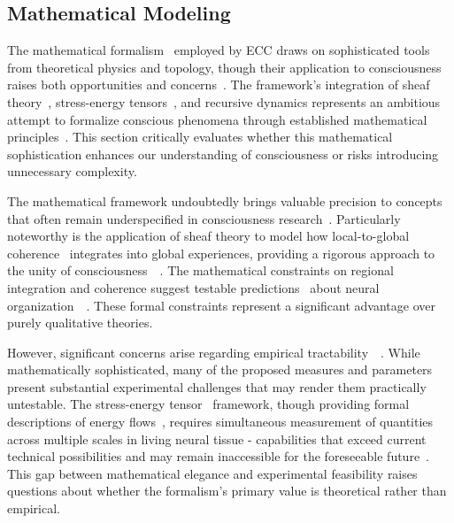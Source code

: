 \subsection*{Mathematical Modeling~}

The mathematical formalism~ employed by ECC draws on sophisticated tools from theoretical physics and topology, though their application to consciousness raises both opportunities and concerns~\cite{rosen2012anticipatory, kelso2016dynamic}. The framework's integration of sheaf theory~, stress-energy tensors~, and recursive dynamics represents an ambitious attempt to formalize conscious phenomena through established mathematical principles~\cite{varela2016embodied, da2024mathematical}. This section critically evaluates whether this mathematical sophistication enhances our understanding of consciousness or risks introducing unnecessary complexity.

The mathematical framework undoubtedly brings valuable precision to concepts that often remain underspecified in consciousness research~\cite{thompson2014waking}. Particularly noteworthy is the application of sheaf theory to model how local-to-global coherence~ integrates into global experiences, providing a rigorous approach to the unity of consciousness~~\cite{zahavi2014self}. The mathematical constraints on regional integration and coherence suggest testable predictions~ about neural organization~~\cite{feinberg2016ancient, haken2013principles}. These formal constraints represent a significant advantage over purely qualitative theories.

However, significant concerns arise regarding empirical tractability~~\cite{seth2021being, dennett2017bacteria}. While mathematically sophisticated, many of the proposed measures and parameters present substantial experimental challenges that may render them practically untestable. The stress-energy tensor~ framework, though providing formal descriptions of energy flows~, requires simultaneous measurement of quantities across multiple scales in living neural tissue - capabilities that exceed current technical possibilities and may remain inaccessible for the foreseeable future~\cite{deacon2013incomplete, bosl2025dynamical}. This gap between mathematical elegance and experimental feasibility raises questions about whether the formalism's primary value is theoretical rather than empirical.

